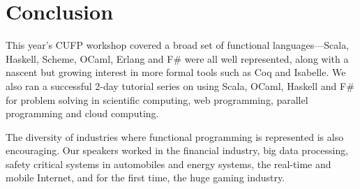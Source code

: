 \documentclass{jfp1}
\begin{document}
\section{Conclusion}

This year's CUFP workshop covered a broad set of functional languages---Scala, Haskell, Scheme, OCaml, Erlang and F\# were all well represented, along with a nascent but growing interest in more formal tools such as Coq and Isabelle.  We also ran a successful 2-day tutorial series on using Scala, OCaml, Haskell and F\# for problem solving in scientific computing, web programming, parallel programming and cloud computing. 

The diversity of industries where functional programming is represented is also encouraging.  Our speakers worked in the financial industry, big data processing, safety critical systems in automobiles and energy systems,  the real-time and mobile Internet, and for the first time, the huge gaming industry.


\end{document}
